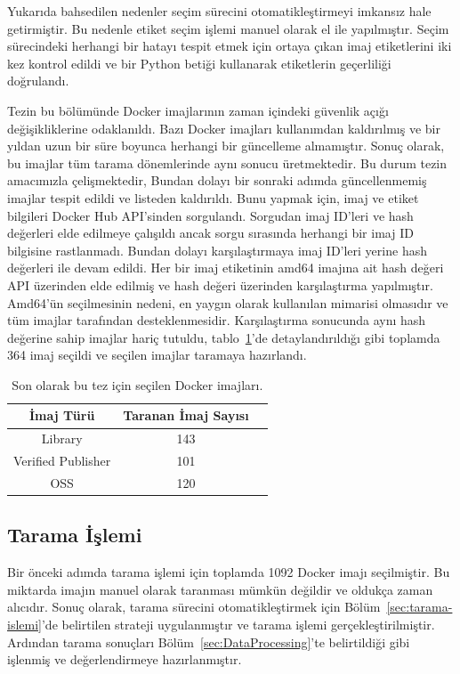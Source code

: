 Yukarıda bahsedilen nedenler seçim sürecini otomatikleştirmeyi imkansız hale getirmiştir. Bu nedenle etiket seçim işlemi manuel olarak el ile yapılmıştır. Seçim sürecindeki herhangi bir hatayı tespit etmek için ortaya çıkan imaj etiketlerini iki kez kontrol edildi ve bir Python betiği kullanarak etiketlerin geçerliliği doğrulandı.

Tezin bu bölümünde Docker imajlarının zaman içindeki güvenlik açığı değişikliklerine odaklanıldı. Bazı Docker imajları kullanımdan kaldırılmış ve bir yıldan uzun bir süre boyunca herhangi bir güncelleme almamıştır. Sonuç olarak, bu imajlar tüm tarama dönemlerinde aynı sonucu üretmektedir. Bu durum tezin amacımızla çelişmektedir, Bundan dolayı bir sonraki adımda güncellenmemiş imajlar tespit edildi ve listeden kaldırıldı. Bunu yapmak için, imaj ve etiket bilgileri Docker Hub API'sinden sorgulandı. Sorgudan imaj ID'leri ve hash değerleri elde edilmeye çalışıldı ancak sorgu sırasında herhangi bir imaj ID bilgisine rastlanmadı. Bundan dolayı karşılaştırmaya imaj ID'leri yerine hash değerleri ile devam edildi. Her bir imaj etiketinin amd64 imajına ait hash değeri API üzerinden elde edilmiş ve hash değeri üzerinden karşılaştırma yapılmıştır. Amd64'ün seçilmesinin nedeni, en yaygın olarak kullanılan mimarisi olmasıdır ve tüm imajlar tarafından desteklenmesidir. Karşılaştırma sonucunda aynı hash değerine sahip imajlar hariç tutuldu, tablo~\ref{tab:final-selected-images}'de detaylandırıldığı gibi toplamda 364 imaj seçildi ve seçilen imajlar taramaya hazırlandı.

\begin{table}[!htbp]
    \caption{Son olarak bu tez için seçilen Docker imajları.}\label{tab:final-selected-images}
    \centering
    \begin{tabular}{ |c|c|c| }
        \hline
        İmaj Türü & Taranan İmaj Sayısı \\
        \hline
        Library & 143 \\
        Verified Publisher & 101 \\
        OSS & 120 \\
        \hline
    \end{tabular}
\end{table}

\subsection{Tarama İşlemi}

Bir önceki adımda tarama işlemi için toplamda 1092 Docker imajı seçilmiştir. Bu miktarda imajın manuel olarak taranması mümkün değildir ve oldukça zaman alıcıdır. Sonuç olarak, tarama sürecini otomatikleştirmek için Bölüm~\ref{sec:tarama-islemi}'de belirtilen strateji uygulanmıştır ve tarama işlemi gerçekleştirilmiştir. Ardından tarama sonuçları Bölüm~\ref{sec:DataProcessing}'te belirtildiği gibi işlenmiş ve değerlendirmeye hazırlanmıştır.

